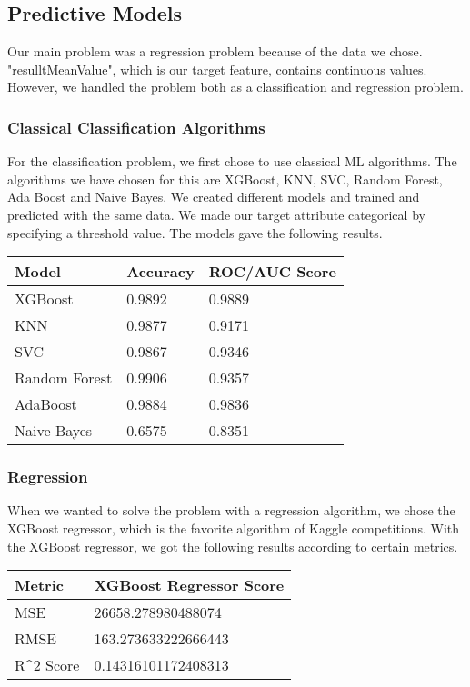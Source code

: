 \documentclass[]{article}
\begin{document}
\subsection{Predictive Models}
Our main problem was a regression problem because of the data we chose. "resulltMeanValue", which is our target feature, contains continuous values. However, we handled the problem both as a classification and regression problem.
\subsubsection{Classical Classification Algorithms}
For the classification problem, we first chose to use classical ML algorithms. The algorithms we have chosen for this are XGBoost, KNN, SVC, Random Forest, Ada Boost and Naive Bayes. We created different models and trained and predicted with the same data. We made our target attribute categorical by specifying a threshold value. The models gave the following results.
\begin{table}[h]
\centering
\begin{tabular}{|l|l|l|}
\hline
\textbf{Model} & \textbf{Accuracy} & \textbf{ROC/AUC Score} \\ \hline
XGBoost        & 0.9892            & 0.9889                 \\ \hline
KNN            & 0.9877            & 0.9171                 \\ \hline
SVC            & 0.9867            & 0.9346                 \\ \hline
Random Forest  & 0.9906            & 0.9357                 \\ \hline
AdaBoost       & 0.9884            & 0.9836                 \\ \hline
Naive Bayes    & 0.6575            & 0.8351                 \\ \hline
\end{tabular}
\end{table}
\subsubsection{Regression}
When we wanted to solve the problem with a regression algorithm, we chose the XGBoost regressor, which is the favorite algorithm of Kaggle competitions. With the XGBoost regressor, we got the following results according to certain metrics.
\begin{table}[h]
\centering
\begin{tabular}{|l|l|}
\hline
\textbf{Metric}            & \textbf{XGBoost Regressor Score} \\ \hline
MSE                        & 26658.278980488074               \\ \hline
RMSE                       & 163.273633222666443              \\ \hline
R\textasciicircum{}2 Score & 0.14316101172408313              \\ \hline
\end{tabular}
\end{table}
\end{document}
